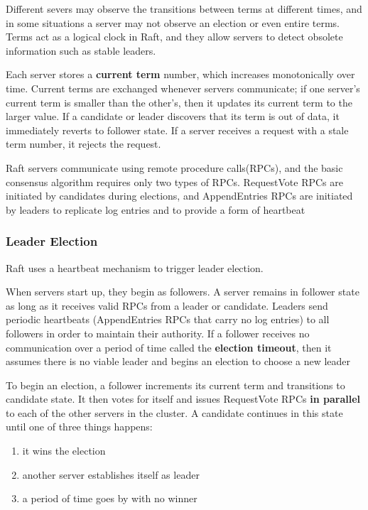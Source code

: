 \documentclass[11pt]{article}
\begin{document}
Different severs may observe the transitions between terms at different times, and in some
situations a server may not observe an election or even entire terms. Terms act as a logical
clock in Raft, and they allow servers to detect obsolete information such as stable leaders.

Each server stores a \textbf{current term} number, which increases monotonically over time. Current terms
are exchanged whenever servers communicate; if one server's current term is smaller than the
other's, then it updates its current term to the larger value. If a candidate or leader
discovers that its term is out of data, it immediately reverts to follower state. If a server
receives a request with a stale term number, it rejects the request.

Raft servers communicate using remote procedure calls(RPCs), and the basic consensus algorithm
requires only two types of RPCs. RequestVote RPCs are initiated by candidates during elections,
and AppendEntries RPCs are initiated by leaders to replicate log entries and to provide a form
of heartbeat
\subsubsection{Leader Election}
\label{sec:org7b03e5c}
Raft uses a heartbeat mechanism to trigger leader election.

When servers start up, they begin as followers. A server remains in follower state as long as it
receives valid RPCs from a leader or candidate. Leaders send periodic heartbeats (AppendEntries
RPCs that carry no log entries) to all followers in order to maintain their authority. If a
follower receives no communication over a period of time called the \textbf{election timeout}, then it
assumes there is no viable leader and begins an election to choose a new leader

To begin an election, a follower increments its current term and transitions to candidate state.
It then votes for itself and issues RequestVote RPCs \textbf{in parallel} to each of the other servers in
the cluster. A candidate continues in this state until one of three things happens:
\begin{enumerate}
\item it wins the election
\item another server establishes itself as leader
\item a period of time goes by with no winner
\end{enumerate}
\end{document}
